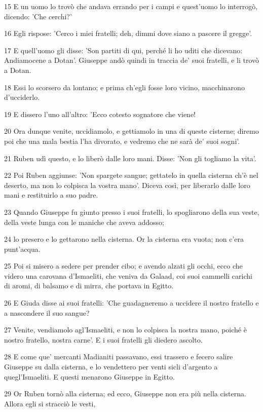 \par 15 E un uomo lo trovò che andava errando per i campi e quest'uomo lo interrogò, dicendo: 'Che cerchi?'
\par 16 Egli rispose: 'Cerco i miei fratelli; deh, dimmi dove siano a pascere il gregge'.
\par 17 E quell'uomo gli disse: 'Son partiti di qui, perché li ho uditi che dicevano: Andiamocene a Dotan'. Giuseppe andò quindi in traccia de' suoi fratelli, e li trovò a Dotan.
\par 18 Essi lo scorsero da lontano; e prima ch'egli fosse loro vicino, macchinarono d'ucciderlo.
\par 19 E dissero l'uno all'altro: 'Ecco cotesto sognatore che viene!
\par 20 Ora dunque venite, uccidiamolo, e gettiamolo in una di queste cisterne; diremo poi che una mala bestia l'ha divorato, e vedremo che ne sarà de' suoi sogni'.
\par 21 Ruben udì questo, e lo liberò dalle loro mani. Disse: 'Non gli togliamo la vita'.
\par 22 Poi Ruben aggiunse: 'Non spargete sangue; gettatelo in quella cisterna ch'è nel deserto, ma non lo colpisca la vostra mano'. Diceva così, per liberarlo dalle loro mani e restituirlo a suo padre.
\par 23 Quando Giuseppe fu giunto presso i suoi fratelli, lo spogliarono della sua veste, della veste lunga con le maniche che aveva addosso;
\par 24 lo presero e lo gettarono nella cisterna. Or la cisterna era vuota; non c'era punt'acqua.
\par 25 Poi si misero a sedere per prender cibo; e avendo alzati gli occhi, ecco che videro una carovana d'Ismaeliti, che veniva da Galaad, coi suoi cammelli carichi di aromi, di balsamo e di mirra, che portava in Egitto.
\par 26 E Giuda disse ai suoi fratelli: 'Che guadagneremo a uccidere il nostro fratello e a nascondere il suo sangue?
\par 27 Venite, vendiamolo agl'Ismaeliti, e non lo colpisca la nostra mano, poiché è nostro fratello, nostra carne'. E i suoi fratelli gli diedero ascolto.
\par 28 E come que' mercanti Madianiti passavano, essi trassero e fecero salire Giuseppe su dalla cisterna, e lo vendettero per venti sicli d'argento a quegl'Ismaeliti. E questi menarono Giuseppe in Egitto.
\par 29 Or Ruben tornò alla cisterna; ed ecco, Giuseppe non era più nella cisterna. Allora egli si stracciò le vesti,
